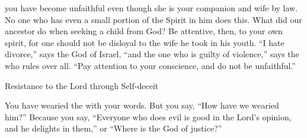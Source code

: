 {you
have become unfaithful
even though she is your companion
and wife
by law.
No
one
who has
even a small portion
of the Spirit
in him does this. What
did our ancestor
do when seeking
a child
from God? Be attentive,
then, to your own spirit,
for one should not
be disloyal
to the wife
he took in his youth.
“I hate
divorce,”
says
the {}
God
of Israel,
“and the one who is guilty
of violence,”
says
the {}
who rules over all.
“Pay attention
to your conscience,
and do not
be unfaithful.”
\par }{\SH Resistance to the Lord through Self-deceit
\par }{\PP {}You have wearied
the {}
with your words.
But you say,
“How
have we wearied
him?” Because you say,
“Everyone
who does
evil
is good
in
the Lord’s
opinion,
and he
delights
in them,” or
“Where
is the God
of justice?”

}
